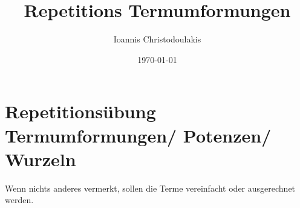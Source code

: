 \documentclass[11pt, a4paper, twoside, fleqn]{article}
\title{Repetitions Termumformungen}
\author{Ioannis Christodoulakis}
\date{\today}
\begin{document}
\maketitle
\newpage
\newpage
\section{Repetitionsübung Termumformungen/ Potenzen/ Wurzeln}

Wenn nichts anderes vermerkt, sollen die Terme vereinfacht oder ausgerechnet werden.
\end{document}

